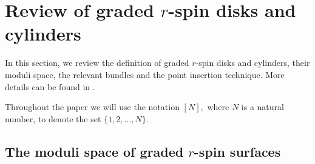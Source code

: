\documentclass[11pt]{amsart}
\theoremstyle{definition}
\theoremstyle{remark}
\newcommand{\<}{\left<}
\renewcommand{\>}{\right>}
\numberwithin{equation}{section}
\begin{document}
\section{Review of graded $r$-spin disks and cylinders}\label{sec review}
\label{sec mod and bundle}
In %
this section, we review the definition of graded $r$-spin disks and cylinders, their moduli space, the %
relevant bundles and %
the point insertion technique. %
More details can be found in \cite{BCT1,TZ1}.

Throughout %
the paper we %
will use the notation $[N],$ where $N$ is a natural number, to denote the set $\{1,2,\dots,N\}.$


\subsection{The moduli space of graded $r$-spin surfaces}
\end{document}
